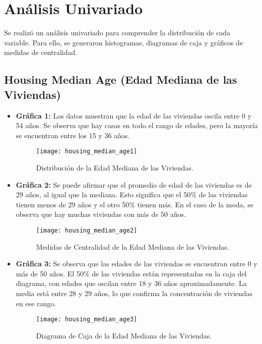 \documentclass[a4paper, 10pt]{article}
\begin{document}
\section{Análisis Univariado}
Se realizó un análisis univariado para comprender la distribución de cada variable. Para ello, se generaron histogramas, diagramas de caja y gráficos de medidas de centralidad. 

\subsection{Housing Median Age (Edad Mediana de las Viviendas)}

\begin{itemize}
    \item \textbf{Gráfica 1:} Los datos muestran que la edad de las viviendas oscila entre 0 y 54 años. Se observa que hay casas en todo el rango de edades, pero la mayoría se encuentran entre los 15 y 36 años.
    \begin{figure}[H]
        \centering
        \texttt{[image: housing\_median\_age1]}
        \caption{Distribución de la Edad Mediana de las Viviendas.}
    \end{figure}

    \item \textbf{Gráfica 2:} Se puede afirmar que el promedio de edad de las viviendas es de 29 años, al igual que la mediana. Esto significa que el 50\% de las viviendas tienen menos de 29 años y el otro 50\% tienen más. En el caso de la moda, se observa que hay muchas viviendas con más de 50 años.
    \begin{figure}[H]
        \centering
        \texttt{[image: housing\_median\_age2]}
        \caption{Medidas de Centralidad de la Edad Mediana de las Viviendas.}
    \end{figure}

    \item \textbf{Gráfica 3:} Se observa que las edades de las viviendas se encuentran entre 0 y más de 50 años. El 50\% de las viviendas están representadas en la caja del diagrama, con edades que oscilan entre 18 y 36 años aproximadamente. La media está entre 28 y 29 años, lo que confirma la concentración de viviendas en ese rango.
    \begin{figure}[H]
        \centering
        \texttt{[image: housing\_median\_age3]}
        \caption{Diagrama de Caja de la Edad Mediana de las Viviendas.}
    \end{figure}
\end{itemize}
\end{document}
